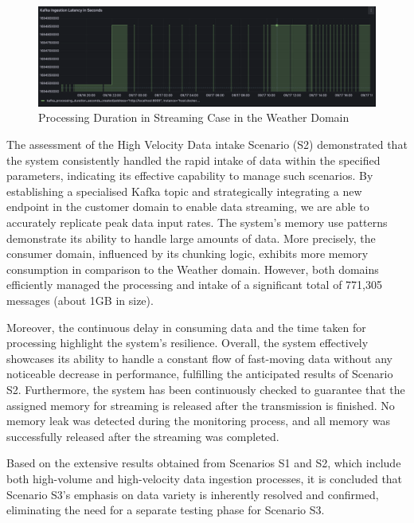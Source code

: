 \documentclass[journal]{IEEEtran}
\begin{document}
\begin{figure}
  \centering
  \includegraphics[width=\textwidth]{images/processing-duration-streaming-case-in-weather-domain.png}
  \caption{Processing Duration in Streaming Case in the Weather Domain}
  \label{processingDurationInStreamingCaseInWeatherDomain}
\end{figure}


The assessment of the High Velocity Data intake Scenario (S2) demonstrated that the system consistently handled the rapid intake of data within the specified parameters, indicating its effective capability to manage such scenarios. By establishing a specialised Kafka topic and strategically integrating a new endpoint in the customer domain to enable data streaming, we are able to accurately replicate peak data input rates. The system's memory use patterns demonstrate its ability to handle large amounts of data. More precisely, the consumer domain, influenced by its chunking logic, exhibits more memory consumption in comparison to the Weather domain. However, both domains efficiently managed the processing and intake of a significant total of 771,305 messages (about 1GB in size). 


Moreover, the continuous delay in consuming data and the time taken for processing highlight the system's resilience. Overall, the system effectively showcases its ability to handle a constant flow of fast-moving data without any noticeable decrease in performance, fulfilling the anticipated results of Scenario S2. Furthermore, the system has been continuously checked to guarantee that the assigned memory for streaming is released after the transmission is finished. No memory leak was detected during the monitoring process, and all memory was successfully released after the streaming was completed.

Based on the extensive results obtained from Scenarios S1 and S2, which include both high-volume and high-velocity data ingestion processes, it is concluded that Scenario S3's emphasis on data variety is inherently resolved and confirmed, eliminating the need for a separate testing phase for Scenario S3.
\end{document}
